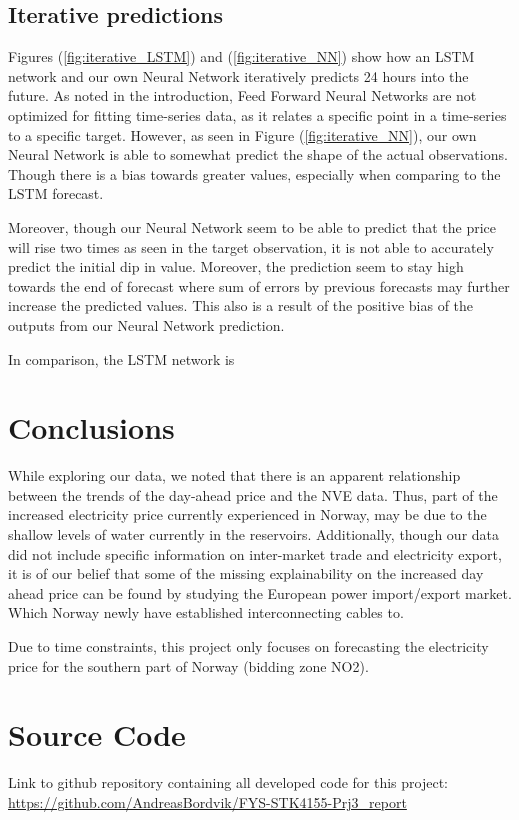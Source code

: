 \documentclass
[twocolumn,
secnumarabic,
nobibnotes,
aps,
prl,
reprint,
groupedaddress,
amsmath,
amssymb,
]{revtex4-2}
\begin{document}
\subsection{Iterative predictions}
Figures (\ref{fig:iterative_LSTM}) and (\ref{fig:iterative_NN}) show how an LSTM network and our own Neural Network iteratively predicts 24 hours into the future. As noted in the introduction, Feed Forward Neural Networks are not optimized for fitting time-series data, as it relates a specific point in a time-series to a specific target. However, as seen in Figure (\ref{fig:iterative_NN}), our own Neural Network is able to somewhat predict the shape of the actual observations. Though there is a bias towards greater values, especially when comparing to the LSTM forecast. 

Moreover, though our Neural Network seem to be able to predict that the price will rise two times as seen in the target observation, it is not able to accurately predict the initial dip in value. Moreover, the prediction seem to stay high towards the end of forecast where sum of errors by previous forecasts may further increase the predicted values. This also is a result of the positive bias of the outputs from our Neural Network prediction. 

In comparison, the LSTM network is 

\section{Conclusions}

While exploring our data, we noted that there is an apparent relationship between the trends of the day-ahead price and the NVE data. Thus, part of the increased electricity price currently experienced in Norway, may be due to the shallow levels of water currently in the reservoirs. Additionally, though our data did not include specific information on inter-market trade and electricity export, it is of our belief that some of the missing explainability on the increased day ahead price can be found by studying the European power import/export market. Which Norway newly have established interconnecting cables to.

Due to time constraints, this project only focuses on forecasting the electricity price for the southern part of Norway (bidding zone NO2). 

\appendix

\section{Source Code}
\label{sec:sc}
Link to github repository containing all developed code for this project: \url{https://github.com/AndreasBordvik/FYS-STK4155-Prj3_report}





\end{document}

